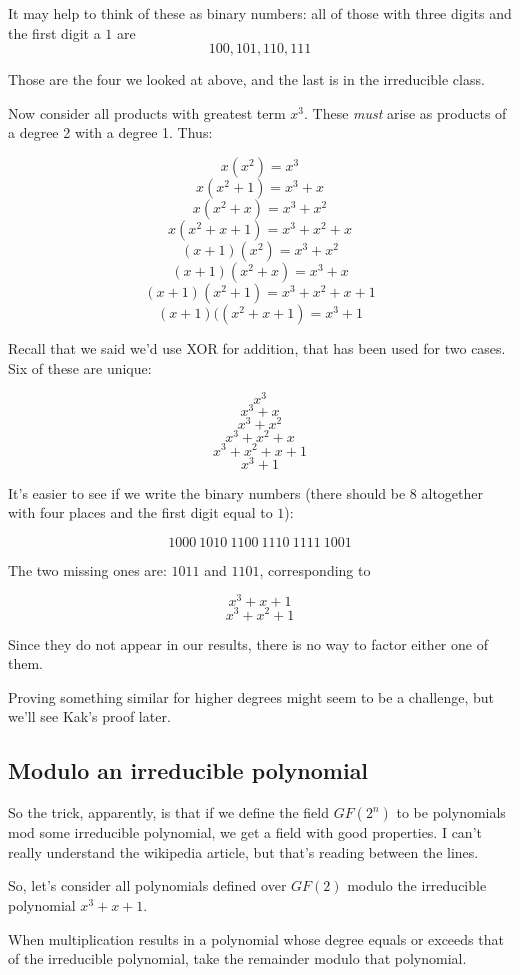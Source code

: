 \documentclass[11pt, oneside]{article}
\begin{document}
It may help to think of these as binary numbers:  all of those with three digits and the first digit a $1$ are
\[ 100, 101, 110, 111 \]

Those are the four we looked at above, and the last is in the irreducible class.

Now consider all products with greatest term $x^3$.  These \emph{must} arise as products of a degree 2 with a degree 1.  Thus:

\[ x (x^2) = x^3 \]
\[ x (x^2 + 1) = x^3 + x \]
\[ x (x^2 + x) = x^3 + x^2 \]
\[ x (x^2 + x + 1) = x^3 + x^2 + x \]
\[ (x + 1)(x^2) = x^3 + x^2 \]
\[ (x + 1)(x^2 + x) = x^3 + x \]
\[ (x + 1)(x^2 + 1) =  x^3 + x^2 + x + 1 \]
\[ (x + 1)((x^2 + x + 1) = x^3 + 1 \]

Recall that we said we'd use XOR for addition, that has been used for two cases.  Six of these are unique:

\[ x^3 \]
\[ x^3 + x \] 
\[ x^3 + x^2 \]
\[ x^3 + x^2 + x \]
\[ x^3 + x^2 + x + 1 \]
\[ x^3 + 1 \]

It's easier to see if we write the binary numbers (there should be 8 altogether with four places and the first digit equal to $1$):

\[ 1000 \ 1010 \ 1100 \ 1110 \ 1111 \ 1001 \]

The two missing ones are:  $1011$ and $1101$, corresponding to

\[ x^3 + x + 1 \]
\[ x^3 + x^2 + 1 \]

Since they do not appear in our results, there is no way to factor either one of them.  

Proving something similar for higher degrees might seem to be a challenge, but we'll see Kak's proof later.

\subsection*{Modulo an irreducible polynomial}
So the trick, apparently, is that if we define the field $GF(2^n)$ to be polynomials mod some irreducible polynomial, we get a field with good properties.  I can't really understand the wikipedia article, but that's reading between the lines.

So, let's consider all polynomials defined over $GF(2)$ modulo the irreducible polynomial $x^3 + x + 1$.

When multiplication results in a polynomial whose degree equals or exceeds that of the irreducible polynomial, take the remainder modulo that polynomial.
\end{document}

